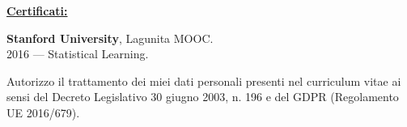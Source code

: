 \documentclass[a4paper,10pt,fullpage]{article}
\begin{document}
\begin{center}
\underline{\textbf{\large Certificati:}}
\end{center}	
\textbf{Stanford University}, Lagunita MOOC.\\
2016 --- Statistical Learning.


\vfill

\hline
\vspace{3pt}
\scriptsize Autorizzo il trattamento dei miei dati personali presenti nel curriculum vitae ai sensi del Decreto Legislativo 30 giugno 2003, n. 196 e del GDPR (Regolamento UE 2016/679).

\end{document}
